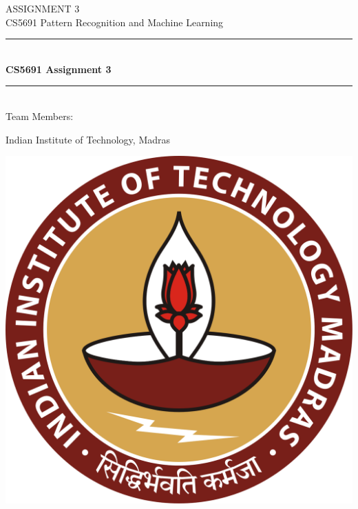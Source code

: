 \documentclass[11pt,a4paper]{article}
\begin{document}
	\begin{titlepage} 
		\begin{center}
		\large{ASSIGNMENT 3}\\
		\vspace{2em}
		\large {CS5691 Pattern Recognition and Machine Learning}
		\vspace{3em}
		
		\rule{0.9\linewidth}{0.5mm} \\[0.4cm]
	    {\Large{\bfseries{CS5691 Assignment 3}}} \\
	    \rule{0.9\linewidth}{0.5mm} \\[3 em]	
	    
	    Team Members: \\
	    \vspace{0.5em}
	   	

		\vspace{1em}

		Indian Institute of Technology, Madras\\    
		
		\vspace{5em}    
	    
	    	\includegraphics[scale = 0.09]{images/iitmlogo.png}
		\end{center}
	\end{titlepage}
\end{document}
